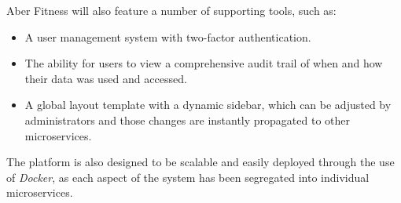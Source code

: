 \par
Aber Fitness will also feature a number of supporting tools, such as:

\begin{itemize}
\item A user management system with two-factor authentication.
\item The ability for users to view a comprehensive audit trail of when and how their data was used and accessed.
\item A global layout template with a dynamic sidebar, which can be adjusted by administrators and those changes are instantly propagated to other microservices.
\end{itemize}

\par
The platform is also designed to be scalable and easily deployed through the use of \textit{Docker}, as each aspect of the system has been segregated into individual microservices. 